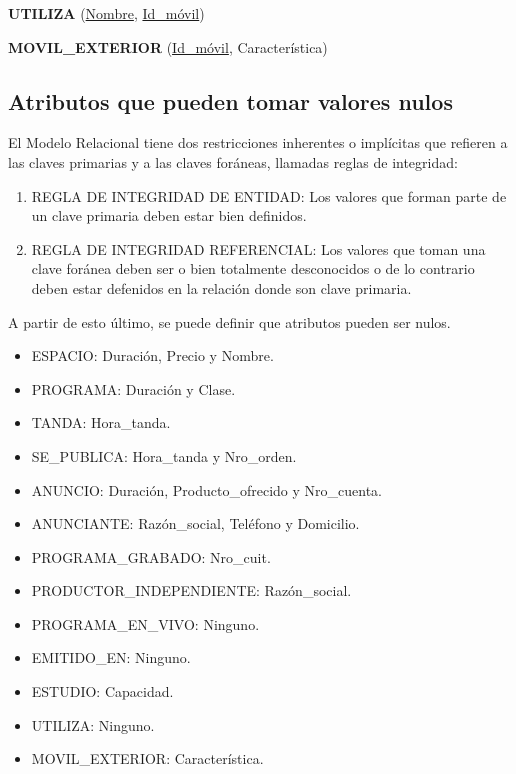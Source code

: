 \documentclass[a4paper,10pt]{article}
\begin{document}
    \begin{flushleft}
      {\bf{UTILIZA}} (\underline{Nombre}, \underline{Id\_m\'ovil})
    \end{flushleft}
  
    \begin{flushleft}
      {\bf{MOVIL\_EXTERIOR}} (\underline{Id\_m\'ovil}, Caracter\'istica)
    \end{flushleft}

  \subsection{Atributos que pueden tomar valores nulos}
    \begin{flushleft}
      El Modelo Relacional tiene dos restricciones inherentes o impl\'icitas que refieren a las claves primarias y a las claves for\'aneas, llamadas reglas de integridad: 
    \end{flushleft}

    \begin{enumerate}
    \item REGLA DE INTEGRIDAD DE ENTIDAD: Los valores que forman parte de un clave primaria deben estar bien definidos.
    \item REGLA DE INTEGRIDAD REFERENCIAL: Los valores que toman una clave for\'anea deben ser o bien totalmente desconocidos o de lo contrario deben estar defenidos en la relaci\'on donde son clave primaria. 
    \end{enumerate}

    \begin{flushleft}
      A partir de esto \'ultimo, se puede definir que atributos pueden ser nulos.
    \end{flushleft}

    \begin{itemize}
      \item ESPACIO: Duraci\'on, Precio y Nombre.
      \item PROGRAMA: Duraci\'on y Clase.
      \item TANDA: Hora\_tanda.
      \item SE\_PUBLICA: Hora\_tanda y Nro\_orden.
      \item ANUNCIO: Duraci\'on, Producto\_ofrecido y Nro\_cuenta.
      \item ANUNCIANTE: Raz\'on\_social, Tel\'efono y Domicilio.
      \item PROGRAMA\_GRABADO: Nro\_cuit.
      \item PRODUCTOR\_INDEPENDIENTE: Raz\'on\_social.
      \item PROGRAMA\_EN\_VIVO: Ninguno.
      \item EMITIDO\_EN: Ninguno.
      \item ESTUDIO: Capacidad.
      \item UTILIZA: Ninguno.
      \item MOVIL\_EXTERIOR: Caracter\'istica.
    \end{itemize}
    
\end{document}

